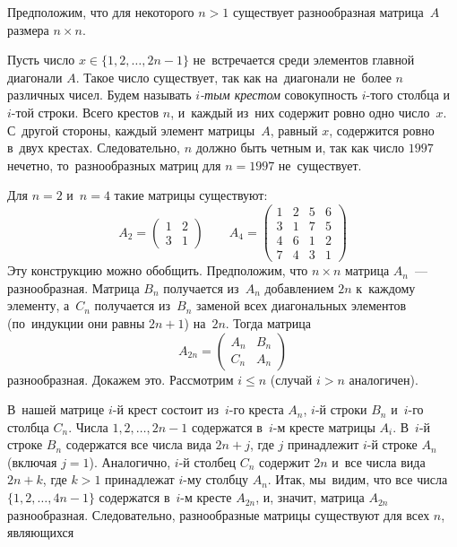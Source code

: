 \ifincludesolutions
\setcounter{jeolmsubproblem}{0}
\subproblem
Предположим, что для некоторого $n > 1$ существует разнообразная матрица~$A$
размера $n \times n$.
\par
Пусть число $x \in \{ 1, 2, \ldots, 2 n - 1 \}$ не~встречается среди элементов
главной диагонали $A$.
Такое число существует, так как на~диагонали не~более $n$ различных чисел.
Будем называть \emph{$i$-тым крестом} совокупность $i$-того столбца и~$i$-той
строки.
Всего крестов $n$, и~каждый из~них содержит ровно одно число~$x$.
С~другой стороны, каждый элемент матрицы~$A$, равный $x$, содержится ровно
в~двух крестах.
Следовательно, $n$ должно быть четным и, так как число $1997$ нечетно,
то~разнообразных матриц для $n = 1997$ не~существует.
\par
\subproblem
Для $n = 2$ и~$n = 4$ такие матрицы существуют:
\[
    A_2
=
    \begin{pmatrix}
        1 & 2 \\
        3 & 1
    \end{pmatrix}
\qquad
    A_4
=
    \begin{pmatrix}
        1 & 2 & 5 & 6 \\
        3 & 1 & 7 & 5 \\
        4 & 6 & 1 & 2 \\
        7 & 4 & 3 & 1
    \end{pmatrix}
\]
Эту конструкцию можно обобщить.
Предположим, что $n \times n$ матрица $A_n$~--- разнообразная.
Матрица $B_n$ получается из~$A_n$ добавлением $2 n$ к~каждому элементу, а~$C_n$
получается из~$B_n$ заменой всех диагональных элементов (по~индукции они равны
$2 n + 1$) на~$2 n$.
Тогда матрица
\[
    A_{2n}
=
    \begin{pmatrix}
        A_n & B_n \\
        C_n & A_n
    \end{pmatrix}
\]
разнообразная.
Докажем это.
Рассмотрим $i \leq n$ (случай $i > n$ аналогичен).
\par
В~нашей матрице $i$-й крест состоит из~$i$-го креста $A_n$, $i$-й
строки $B_n$ и~$i$-го столбца $C_n$.
Числа $1, 2, \ldots, 2 n - 1$ содержатся в~$i$-м кресте матрицы $A_i$.
В~$i$-й строке $B_n$ содержатся все числа вида $2 n + j$, где $j$ принадлежит
$i$-й строке $A_n$ (включая $j = 1$).
Аналогично, $i$-й столбец $C_n$ содержит $2n$ и~все числа вида $2 n + k$, где
$k > 1$ принадлежат $i$-му столбцу $A_n$.
Итак, мы~видим, что все числа $\{1, 2, \ldots, 4 n - 1\}$ содержатся в~$i$-м
кресте $A_{2n}$, и, значит, матрица $A_{2n}$ разнообразная.
Следовательно, разнообразные матрицы существуют для всех $n$, являющихся
